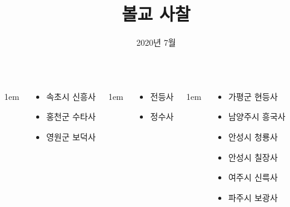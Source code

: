 \documentclass[	20pt, 
							a0paper, 
							landscape,
							margin=0mm, %
							innermargin=10mm,  		%
							blockverticalspace=4mm, %
							colspace=5mm, 
							subcolspace=0mm
							]{tikzposter}
\title{ 볼교 사찰 }
\author{ 2020년 7월 }
\begin{document}
	\maketitle[
					width=841mm,
					linewidth = 2mm,
					innersep=4mm,
					titletotopverticalspace=2mm, %
					titletoblockverticalspace=2mm, %
					titletextscale =4, 
				]


	\begin{columns}


			{
					\setlength{\leftmargini}{4em}
					\setlength{\labelsep} {1em}
				\begin{LARGE}
					\begin{itemize}
					\item 속초시 신흥사
					\item 홍천군 수타사
					\item 영원군 보덕사
					\end{itemize}
				\end{LARGE}
			} %

			{
					\setlength{\leftmargini}{4em}
					\setlength{\labelsep} {1em}
				\begin{LARGE}
					\begin{itemize}
					\item 전등사
					\item 정수사
					\end{itemize}
				\end{LARGE}
			} %


			{
					\setlength{\leftmargini}{4em}
					\setlength{\labelsep} {1em}
				\begin{LARGE}
					\begin{itemize}
					\item 가평군 현등사
					\item 남양주시 흥국사
					\item 안성시 청룡사

					\item 안성시 칠장사
					\item 여주시 신륵사
					\item 파주시 보광사


\end{itemize}
\end{LARGE}}
\end{columns}
\end{document}
